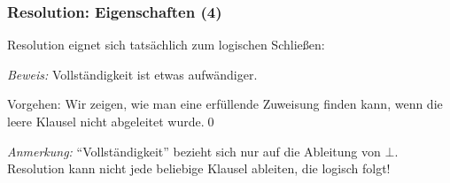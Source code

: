 \documentclass[aspectratio=1610,onlymath]{beamer}
\begin{document}
\begin{frame}[t]\frametitle{Resolution: Eigenschaften (4)}

Resolution eignet sich tatsächlich zum logischen Schließen:\medskip


\emph{Beweis:} \alert{Vollständigkeit} ist etwas aufwändiger.\medskip

Vorgehen: Wir zeigen, wie
man eine erfüllende Zuweisung finden kann, wenn die leere Klausel nicht abgeleitet wurde.\qed
\bigskip

\emph{Anmerkung:} "`Vollständigkeit"' bezieht sich nur auf die Ableitung von $\bot$. Resolution kann nicht
jede beliebige Klausel ableiten, die logisch folgt!

\end{frame}
\end{document}
